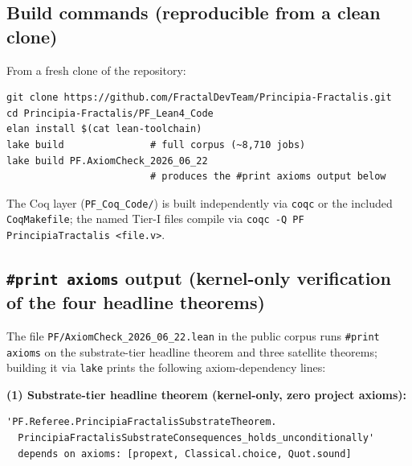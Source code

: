 \documentclass[11pt,a4paper]{amsart}
\theoremstyle{plain}
\theoremstyle{definition}
\begin{document}
\subsection{Build commands (reproducible from a clean clone)}\label{subsec:repro-build}

From a fresh clone of the repository:

\begin{verbatim}
git clone https://github.com/FractalDevTeam/Principia-Fractalis.git
cd Principia-Fractalis/PF_Lean4_Code
elan install $(cat lean-toolchain)
lake build               # full corpus (~8,710 jobs)
lake build PF.AxiomCheck_2026_06_22
                         # produces the #print axioms output below
\end{verbatim}

The Coq layer (\texttt{PF\_Coq\_Code/}) is built independently via \texttt{coqc} or the included \texttt{CoqMakefile}; the named Tier-I files compile via \texttt{coqc -Q PF PrincipiaTractalis <file.v>}.

\subsection{\texttt{\#print axioms} output (kernel-only verification of the four headline theorems)}\label{subsec:repro-axioms}

The file \texttt{PF/AxiomCheck\_2026\_06\_22.lean} in the public corpus runs \texttt{\#print axioms} on the substrate-tier headline theorem and three satellite theorems; building it via \texttt{lake} prints the following axiom-dependency lines:

\smallskip
\textbf{(1) Substrate-tier headline theorem (kernel-only, zero project axioms):}
\begin{verbatim}
'PF.Referee.PrincipiaFractalisSubstrateTheorem.
  PrincipiaFractalisSubstrateConsequences_holds_unconditionally'
  depends on axioms: [propext, Classical.choice, Quot.sound]
\end{verbatim}
\end{document}
